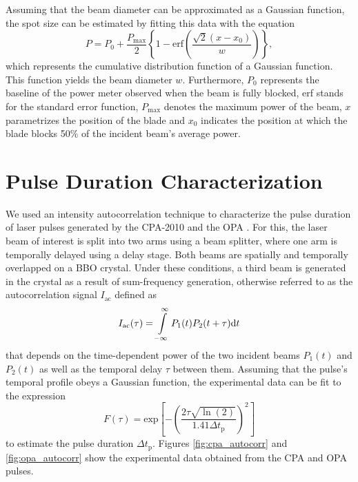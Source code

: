 Assuming that the beam diameter can be approximated as a Gaussian function, the spot size can be estimated by fitting this data with the equation
%
\begin{equation}
	\label{eq:cdf_gauss}
	P = P_0 + \dfrac{P_{\mathrm{max}}}{2} \left\{ 1 - \mathrm{erf} \left( \dfrac{\sqrt{2}(x - x_0)}{w} \right) \right\},
\end{equation}
%
which represents the cumulative distribution function of a Gaussian function. This function yields the beam diameter $w$. Furthermore, $P_0$ represents the baseline of the power meter observed when the beam is fully blocked, erf stands for the standard error function, $P_\text{max}$ denotes the maximum power of the beam, $x$ parametrizes the position of the blade and $x_0$ indicates the position at which the blade blocks 50\% of the incident beam's average power.

\section{Pulse Duration Characterization}
\label{section:pulse_duration}

We used an intensity autocorrelation technique to characterize the pulse duration of laser pulses generated by the CPA-2010 and the OPA \cite{paschotta2008field}. For this, the laser beam of interest is split into two arms using a beam splitter, where one arm is temporally delayed using a delay stage. Both beams are spatially and temporally overlapped on a BBO crystal. Under these conditions, a third beam is generated in the crystal as a result of sum-frequency generation, otherwise referred to as the autocorrelation signal $I_\text{ac}$ defined as
%
\begin{equation}
	I_\text{ac}(\tau) = \int\displaylimits_{-\infty}^{\infty} P_1(t)P_2(t+\tau) \text{d}t
\end{equation}
%
that depends on the time-dependent power of the two incident beams $P_1(t)$ and $P_2(t)$ as well as the temporal delay $\tau$ between them. Assuming that the pulse's temporal profile obeys a Gaussian function, the experimental data can be fit to the expression
%
\begin{equation}
	F(\tau) = \mathrm{ exp}\left[ - \left( \dfrac{2\tau\sqrt{\ln (2)}}{1.41 \Delta t_\text{p}} \right)^2\right]
	\label{eq:pulse_duration_fit}
\end{equation}
%
to estimate the pulse duration $\Delta t_\text{p}$. Figures \ref{fig:cpa_autocorr} and \ref{fig:opa_autocorr} show the experimental data obtained from the CPA and OPA pulses.

